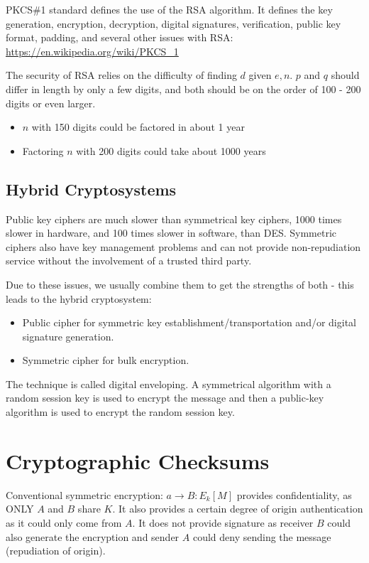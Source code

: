 \documentclass{article}
\begin{document}
PKCS\#1 standard defines the use of the RSA algorithm. It defines the key generation, encryption, decryption, digital signatures, verification, public key format, padding, and several other issues with RSA: \url{https://en.wikipedia.org/wiki/PKCS_1}

The security of RSA relies on the difficulty of finding $d$ given ${e, n}$. $p$ and $q$ should differ in length by only a few digits, and both should be on the order of 100 - 200 digits or even larger.
\begin{itemize}
	\item $n$ with 150 digits could be factored in about 1 year
	\item Factoring $n$ with 200 digits could take about 1000 years
\end{itemize}
\subsection{Hybrid Cryptosystems}
Public key ciphers are much slower than symmetrical key ciphers, 1000 times slower in hardware, and 100 times slower in software, than DES. Symmetric ciphers also have key management problems and can not provide non-repudiation service without the involvement of a trusted third party.

Due to these issues, we usually combine them to get the strengths of both - this leads to the hybrid cryptosystem:
\begin{itemize}
	\item Public cipher for symmetric key establishment/transportation and/or digital signature generation.
	\item Symmetric cipher for bulk encryption.
\end{itemize}
The technique is called digital enveloping. A symmetrical algorithm with a random session key is used to encrypt the message and then a public-key algorithm is used to encrypt the random session key.

\section{Cryptographic Checksums}
Conventional symmetric encryption: $a \rightarrow B: E_{k}[M]$ provides confidentiality, as ONLY $A$ and $B$ share $K$. It also provides a certain degree of origin authentication as it could only come from $A$. It does not provide signature as receiver $B$ could also generate the encryption and sender $A$ could deny sending the message (repudiation of origin).
\end{document}
